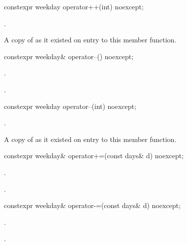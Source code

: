%
\begin{itemdecl}
constexpr weekday operator++(int) noexcept;
\end{itemdecl}

\begin{itemdescr}
\pnum
\effects
{}.

\pnum
\returns
A copy of  as it existed on entry to this member function.
\end{itemdescr}

%
\begin{itemdecl}
constexpr weekday& operator--() noexcept;
\end{itemdecl}

\begin{itemdescr}
\pnum
\effects
{}.

\pnum
\returns
{}.
\end{itemdescr}

%
\begin{itemdecl}
constexpr weekday operator--(int) noexcept;
\end{itemdecl}

\begin{itemdescr}
\pnum
\effects
{}.

\pnum
\returns
A copy of  as it existed on entry to this member function.
\end{itemdescr}

%
\begin{itemdecl}
constexpr weekday& operator+=(const days& d) noexcept;
\end{itemdecl}

\begin{itemdescr}
\pnum
\effects
{}.

\pnum
\returns
{}.
\end{itemdescr}

%
\begin{itemdecl}
constexpr weekday& operator-=(const days& d) noexcept;
\end{itemdecl}

\begin{itemdescr}
\pnum
\effects
{}.

\pnum
\returns
{}.
\end{itemdescr}


